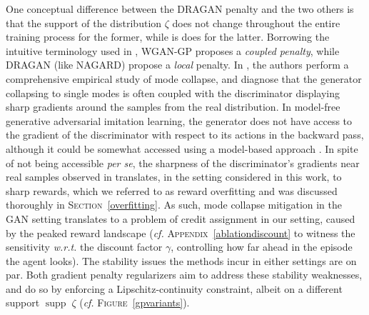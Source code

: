 One conceptual difference between the DRAGAN penalty and the two others is that
the support of the distribution $\zeta$ does not change throughout the entire training process
for the former, while is does for the latter.
Borrowing the intuitive terminology used in \cite{Kodali2017-xt},
WGAN-GP proposes a \textit{coupled penalty},
while DRAGAN (like NAGARD) propose a \textit{local} penalty.
In \cite{Kodali2017-xt}, the authors perform a comprehensive empirical study
of mode collapse, and diagnose that the generator collapsing to single modes is
often coupled with the discriminator displaying sharp gradients around the samples from
the real distribution.
In model-free generative adversarial imitation learning,
the generator does not have access to the gradient of the discriminator with respect
to its actions in the backward pass, although it could be somewhat accessed using
a model-based approach \cite{Baram2017-es}.
In spite of not being accessible \textit{per se},
the sharpness of the discriminator's gradients near real samples observed in \cite{Kodali2017-xt}
translates, in the setting considered in this work,
to sharp rewards, which we referred to as reward overfitting and
was discussed thoroughly in \textsc{Section}~\ref{overfitting}.
As such, mode collapse mitigation in the GAN setting translates to
a problem of credit assignment in our setting, caused by the peaked reward landscape
(\textit{cf.} \textsc{Appendix}~\ref{ablationdiscount} to witness the sensitivity
\textit{w.r.t.} the discount factor $\gamma$, controlling how far ahead in the episode
the agent looks).
The stability issues the methods incur in either settings are on par.
Both gradient penalty regularizers aim to address these stability weaknesses,
and do so by enforcing a Lipschitz-continuity constraint,
albeit on a different support $\operatorname{supp} \; \zeta$
(\textit{cf.} \textsc{Figure}~\ref{gpvariants}).

